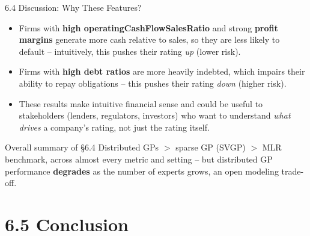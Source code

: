 \documentclass[aspectratio=169,10pt]{beamer}
\begin{document}
\begin{frame}{6.4 Discussion: Why These Features?}
  \begin{itemize}
    \item Firms with \textbf{high operatingCashFlowSalesRatio} and strong
          \textbf{profit margins} generate more cash relative to sales, so
          they are less likely to default -- intuitively, this pushes their
          rating \emph{up} (lower risk).
    \item Firms with \textbf{high debt ratios} are more heavily indebted,
          which impairs their ability to repay obligations -- this pushes
          their rating \emph{down} (higher risk).
    \item These results make intuitive financial sense and could be useful
          to stakeholders (lenders, regulators, investors) who want to
          understand \emph{what drives} a company's rating, not just the
          rating itself.
  \end{itemize}
  \vspace{0.3em}
  \begin{alertblock}{Overall summary of \S6.4}
    Distributed GPs $>$ sparse GP (SVGP) $>$ MLR benchmark, across almost
    every metric and setting -- but distributed GP performance
    \textbf{degrades} as the number of experts grows, an open modeling
    trade-off.
  \end{alertblock}
\end{frame}

\section{6.5 Conclusion}
\end{document}
